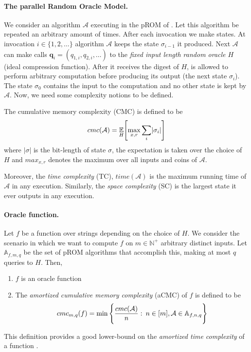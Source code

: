 \paragraph{The parallel Random Oracle Model.} We consider an algorithm $\mathcal{A}$ executing in the pROM of \cite{Alwen:2015:HPC:2746539.2746622}. Let this algorithm be repeated an arbitrary amount of times. After each invocation we make states. At invocation $i \in \{ 1,2, \dots \}$ algorithm $\mathcal{A}$ keeps the state $\sigma_{i-1}$ it produced. Next $\mathcal{A}$ can make calls $\textbf{q}_i = (q_{1,i}, q_{2,i}, \dots)$
to the \textit{fixed input length random oracle $H$} (ideal compression function). After it receives the digest of $H$, is allowed to perform arbitrary computation before producing its output (the next state $\sigma_i$). The state $\sigma_0$ contains the input to the computation and no other state is kept by $\mathcal{A}$. Now, we need some complexity notions to be defined.

The cumulative memory complexity (CMC) is defined to be
\begin{equation}
    cmc(\mathcal{A}) = \underset{H}{\mathbb{E}} \Bigg{[} \underset{x,r}{\max} \sum_{i} \lvert \sigma_i \rvert \Bigg{]}
\end{equation}
where $\lvert \sigma \rvert$ is the bit-length of state $\sigma$, the expectation is taken over the choice of $H$ and $max_{x,r}$ denotes the maximum over all inputs and coins of $\mathcal{A}$.

Moreover, the \textit{time complexity} (TC), $time(\mathcal{A})$ is the maximum running time of $\mathcal{A}$ in any execution. Similarly, the \textit{space complexity} (SC) is the largest state it ever outputs in any execution.

\paragraph{Oracle function.} Let $f$ be a function over strings depending on the choice of $H$. We consider the scenario in which we want to compute $f$ on $m \in \mathbb{N}^{+}$ arbitrary distinct inputs.
Let $\mathbb{A}_{f,m,q}$ be the set of pROM algorithms that accomplish this, making at most $q$ queries to
$H$. Then,

\begin{enumerate}[label=(\alph*)]
  \item $f$ is an oracle function \\

  \item The \textit{amortized cumulative memory complexity} (aCMC) of $f$ is defined to be
  \begin{equation}
      cmc_{m,q}(f) = \min \Bigg{\{} \frac{cmc(\mathcal{A})}{n} : \: n \in [m], \mathcal{A} \in \mathbb{A}_{f,n,q} \Bigg{\}}
  \end{equation}
\end{enumerate}
This definition provides a good lower-bound on the \textit{amortized time complexity} of a function \cite{Alwen:2015:HPC:2746539.2746622}.


